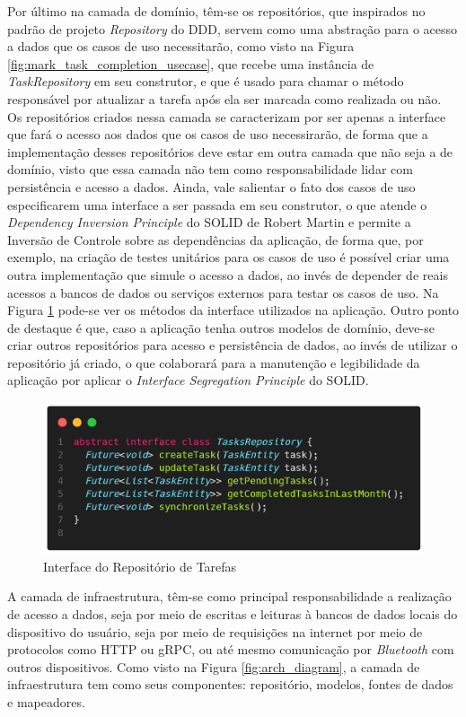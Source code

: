 \documentclass[12pt, %
openright, 
oneside, %
a4paper,    %
brazil]{facom-ufu-abntex2}
\begin{document}
Por último na camada de domínio, têm-se os repositórios, que inspirados no padrão de projeto \textit{Repository} do DDD, servem como uma abstração para o acesso a dados que os casos de uso necessitarão, como visto na Figura \ref{fig:mark_task_completion_usecase}, que recebe uma instância de \textit{TaskRepository} em seu construtor, e que é usado para chamar o método responsável por atualizar a tarefa após ela ser marcada como realizada ou não. Os repositórios criados nessa camada se caracterizam por ser apenas a interface que fará o acesso aos dados que os casos de uso necessirarão, de forma que a implementação desses repositórios deve estar em outra camada que não seja a de domínio, visto que essa camada não tem como responsabilidade lidar com persistência e acesso a dados. Ainda, vale salientar o fato dos casos de uso especificarem uma interface a ser passada em seu construtor, o que atende o \textit{Dependency Inversion Principle} do SOLID de Robert Martin e permite a Inversão de Controle sobre as dependências da aplicação, de forma que, por exemplo, na criação de testes unitários para os casos de uso é possível criar uma outra implementação que simule o acesso a dados, ao invés de depender de reais acessos a bancos de dados ou serviços externos para testar os casos de uso. Na Figura \ref{fig:tasks_repository} pode-se ver os métodos da interface utilizados na aplicação. Outro ponto de destaque é que, caso a aplicação tenha outros modelos de domínio, deve-se criar outros repositórios para acesso e persistência de dados, ao invés de utilizar o repositório já criado, o que colaborará para a manutenção e legibilidade da aplicação por aplicar o \textit{Interface Segregation Principle} do SOLID.

\begin{figure}[ht]
    \centering
    \includegraphics[width=.65\textwidth, trim={0 30 0 100}, clip]{figures/arch/tasks_repository.png}
    \caption{Interface do Repositório de Tarefas}
    \label{fig:tasks_repository}
\end{figure}

A camada de infraestrutura, têm-se como principal responsabilidade a realização de acesso a dados, seja por meio de escritas e leituras à bancos de dados locais do dispositivo do usuário, seja por meio de requisições na internet por meio de protocolos como HTTP ou gRPC, ou até mesmo comunicação por \textit{Bluetooth} com outros dispositivos. Como visto na Figura \ref{fig:arch_diagram}, a camada de infraestrutura tem como seus componentes: repositório, modelos, fontes de dados e mapeadores.
\end{document}
